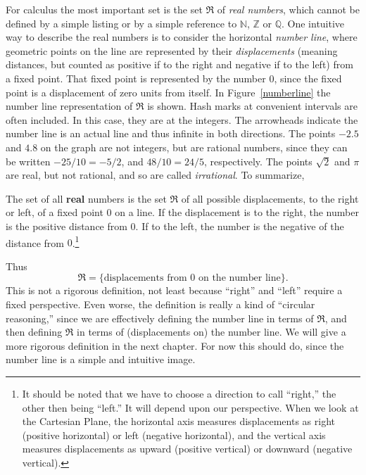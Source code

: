 For calculus the most
important set is the set $\Re$ of {\it real numbers}, which cannot be defined
by a simple listing or by a simple reference to $\mathbb{N}$, $\mathbb{Z}$ or
$\mathbb{Q}$.  One intuitive way to describe the real numbers
is to consider the horizontal {\it number line}, where geometric points on 
the line are represented by their {\it displacements} 
(meaning distances, but counted as positive if to the right
and negative if to the left) from a fixed point.
That fixed point is represented by the number 0, since the fixed
point is a displacement of zero units from itself.
In Figure~\ref{numberline}
the  number line representation of $\Re$
is shown.  Hash marks at convenient intervals are often included.
In this case, they are at the integers.  The arrowheads indicate
the number line is an actual line and thus infinite in both directions.  
The points $-2.5$ and $4.8$ on the graph are not integers, but are
rational numbers, since they can be written
$-25/10=-5/2$, and $48/10=24/5$, respectively.
The points $\sqrt2$ and $\pi$ are real, but not rational, and
so are called {\it irrational}.  To summarize,
\begin{definition}The set of all {\bf real} numbers is 
the set $\Re$ of all possible displacements, to the right
or left, of a fixed point $0$ on a line.  
If the displacement is to the right, the number is the positive
distance from $0$.  If to the left, the number is the negative
of the distance from $0$.\footnote{%
It should be noted that we have to choose a direction to call
``right,'' the other then being ``left.'' It will depend
upon our perspective.  When we look at the Cartesian Plane,
the horizontal axis measures displacements as right (positive horizontal)
or left (negative horizontal), and the vertical
axis measures displacements as upward (positive vertical)
or downward (negative vertical).
}\end{definition}
Thus 
\begin{equation}\Re=\{\text{displacements from $0$ on the number line}\}.
\end{equation}
This is not a rigorous definition, not least because ``right'' and
``left'' require a fixed perspective.  Even worse,
the definition is really a kind of
``circular reasoning,'' since
we are effectively defining the number line in terms of $\Re$, and
then defining $\Re$ in terms of (displacements on) 
the number line.  We will give a 
more rigorous definition in the next chapter.
For now this should do,
since the number line is a simple and intuitive image. 



